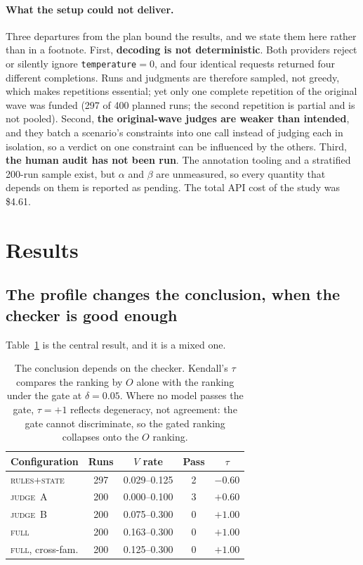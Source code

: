 \documentclass{article}
\begin{document}
\paragraph{What the setup could not deliver.}
Three departures from the plan bound the results, and we state them here rather than in a footnote. First, \textbf{decoding is not deterministic}. Both providers reject or silently ignore \texttt{temperature}$=0$, and four identical requests returned four different completions. Runs and judgments are therefore sampled, not greedy, which makes repetitions essential; yet only one complete repetition of the original wave was funded (297 of 400 planned runs; the second repetition is partial and is not pooled). Second, \textbf{the original-wave judges are weaker than intended}, and they batch a scenario's constraints into one call instead of judging each in isolation, so a verdict on one constraint can be influenced by the others. Third, \textbf{the human audit has not been run}. The annotation tooling and a stratified 200-run sample exist, but $\alpha$ and $\beta$ are unmeasured, so every quantity that depends on them is reported as pending. The total API cost of the study was \$4.61.

\section{Results}
\label{sec:results}

\subsection{The profile changes the conclusion, when the checker is good enough}

Table~\ref{tab:configs} is the central result, and it is a mixed one.

\begin{table}[t]
\caption{The conclusion depends on the checker. Kendall's $\tau$ compares the ranking by $O$ alone with the ranking under the gate at $\delta=0.05$. Where no model passes the gate, $\tau=+1$ reflects degeneracy, not agreement: the gate cannot discriminate, so the gated ranking collapses onto the $O$ ranking.}
\label{tab:configs}
\vskip 0.1in
\begin{center}\begin{small}
\setlength{\tabcolsep}{4pt}
\begin{tabular}{lcccc}
\toprule
Configuration & Runs & $V$ rate & Pass & $\tau$ \\
\midrule
\textsc{rules+state} & 297 & 0.029--0.125 & 2 & $-0.60$ \\
\textsc{judge~A}     & 200 & 0.000--0.100 & 3 & $+0.60$ \\
\textsc{judge~B}     & 200 & 0.075--0.300 & 0 & $+1.00$ \\
\textsc{full}        & 200 & 0.163--0.300 & 0 & $+1.00$ \\
\textsc{full}, cross-fam. & 200 & 0.125--0.300 & 0 & $+1.00$ \\
\bottomrule
\end{tabular}
\end{small}\end{center}
\vskip -0.1in
\end{table}
\end{document}
